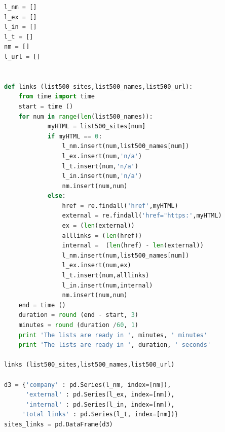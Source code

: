 \documentclass{article}
\begin{document}
\begin{lstlisting}[language=Python]
l_nm = []
l_ex = []
l_in = []
l_t = []
nm = []
l_url = []


def links (list500_sites,list500_names,list500_url):
    from time import time    
    start = time ()
    for num in range(len(list500_names)):        
            myHTML = list500_sites[num]
            if myHTML == 0:
                l_nm.insert(num,list500_names[num])            
                l_ex.insert(num,'n/a')
                l_t.insert(num,'n/a')
                l_in.insert(num,'n/a')
                nm.insert(num,num)                
            else: 
                href = re.findall('href',myHTML)
                external = re.findall('href="https:',myHTML)
                ex = (len(external))
                alllinks = (len(href))
                internal =  (len(href) - len(external))
                l_nm.insert(num,list500_names[num])            
                l_ex.insert(num,ex)
                l_t.insert(num,alllinks)
                l_in.insert(num,internal)
                nm.insert(num,num)                
    end = time ()
    duration = round (end - start, 3)
    minutes = round (duration /60, 1)
    print 'The lists are ready in ', minutes, ' minutes'
    print 'The lists are ready in ', duration, ' seconds'
 
links (list500_sites,list500_names,list500_url)

d3 = {'company' : pd.Series(l_nm, index=[nm]),
      'external' : pd.Series(l_ex, index=[nm]),
      'internal' : pd.Series(l_in, index=[nm]),
     'total links' : pd.Series(l_t, index=[nm])}
sites_links = pd.DataFrame(d3)    
\end{lstlisting}
\end{document}
